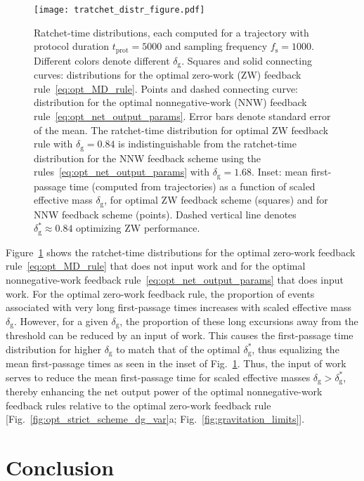 \documentclass[%
reprint,
bibnotes, amsmath, amssymb, aps, pre,
 showkeys,
floatfix
]{revtex4-2}
\newcommand{\mrm}{\mathrm}
\newcommand{\dg}{\delta_{\mrm{g}}}
\newcommand{\fs}{f_{\mrm{s}}}
\begin{document}
\begin{figure} 
    \centering 
    \texttt{[image: tratchet\_distr\_figure.pdf]}
    \caption{
    Ratchet-time distributions, each computed for a trajectory with protocol duration $t_{\mrm{prot}} = 5000$ and sampling frequency $\fs=1000$.
    Different colors denote different $\dg$. 
    Squares and solid connecting curves: distributions for the optimal zero-work (ZW) feedback rule~\eqref{eq:opt_MD_rule}. 
    Points and dashed connecting curve: distribution for the optimal nonnegative-work (NNW) feedback rule~\eqref{eq:opt_net_output_params}. 
    Error bars denote standard error of the mean. 
    The ratchet-time distribution for optimal ZW feedback rule with $\dg = 0.84$ is indistinguishable from the ratchet-time distribution for the NNW feedback scheme using the rules~\eqref{eq:opt_net_output_params} with $\dg = 1.68$.
    Inset: mean first-passage time (computed from trajectories) as a function of scaled effective mass $\dg$, for optimal ZW feedback scheme (squares) and for NNW feedback scheme (points). 
    Dashed vertical line denotes $\dg^{*} \approx 0.84$ optimizing ZW performance.
    }
    \label{fig:ratchet_time_distr}
\end{figure}

Figure~\ref{fig:ratchet_time_distr} shows the ratchet-time distributions for the optimal zero-work feedback rule~\eqref{eq:opt_MD_rule} that does not input work and for the optimal nonnegative-work feedback rule~\eqref{eq:opt_net_output_params} that does input work.
For the optimal zero-work feedback rule, the proportion of events associated with very long first-passage times increases with scaled effective mass $\dg$. 
However, for a given $\dg$, the proportion of these long excursions away from the threshold can be reduced by an input of work. 
This causes the first-passage time distribution for higher $\dg$ to match that of the optimal $\dg^{*}$, thus equalizing the mean first-passage times as seen in the inset of Fig.~\ref{fig:ratchet_time_distr}.
Thus, the input of work serves to reduce the mean first-passage time for scaled effective masses $\dg > \dg^{*}$, thereby enhancing the net output power of the optimal nonnegative-work feedback rules relative to the optimal zero-work feedback rule [Fig.~\ref{fig:opt_strict_scheme_dg_var}a; Fig.~\ref{fig:gravitation_limits}].


\section{Conclusion} 
\label{sec:conclusion}
\end{document}
